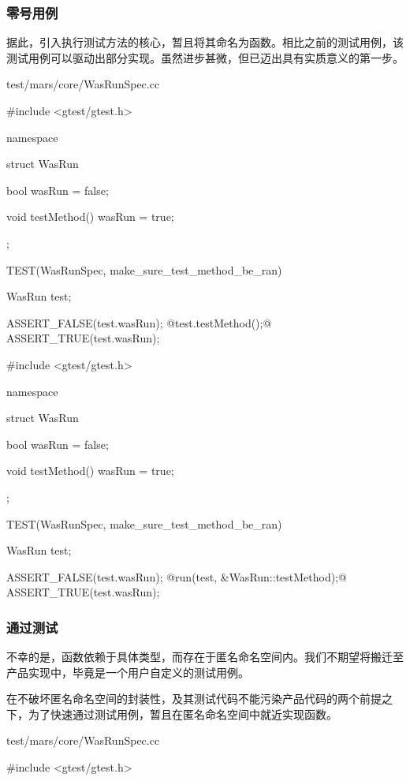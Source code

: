 \begin{content}
\subsubsection{零号用例}

据此，引入执行测试方法的核心，暂且将其命名为函数。相比之前的测试用例，该测试用例可以驱动出部分实现。虽然进步甚微，但已迈出具有实质意义的第一步。

\begin{diff}{test/mars/core/WasRunSpec.cc}
\begin{minicpp}
#include <gtest/gtest.h>

namespace {
  struct WasRun {
    bool wasRun = false;

    void testMethod() {
      wasRun = true;
    }
  };
}

TEST(WasRunSpec, make_sure_test_method_be_ran) {
  WasRun test;

  ASSERT_FALSE(test.wasRun);
  @test.testMethod();@
  ASSERT_TRUE(test.wasRun);
}
\end{minicpp}
\tcblower
\begin{minicpp}
#include <gtest/gtest.h>

namespace {
  struct WasRun {
    bool wasRun = false;

    void testMethod() {
      wasRun = true;
    }
  };
}

TEST(WasRunSpec, make_sure_test_method_be_ran) {
  WasRun test;

  ASSERT_FALSE(test.wasRun);
  @run(test, &WasRun::testMethod);@
  ASSERT_TRUE(test.wasRun);
}
\end{minicpp}
\end{diff}

\subsubsection{通过测试}

不幸的是，函数依赖于具体类型，而存在于匿名命名空间内。我们不期望将搬迁至产品实现中，毕竟是一个用户自定义的测试用例。

在不破坏匿名命名空间的封装性，及其测试代码不能污染产品代码的两个前提之下，为了快速通过测试用例，暂且在匿名命名空间中就近实现函数。

\begin{nodiff}{test/mars/core/WasRunSpec.cc}
\begin{c++}
#include <gtest/gtest.h>


\end{c++}
\end{nodiff}
\end{content}
